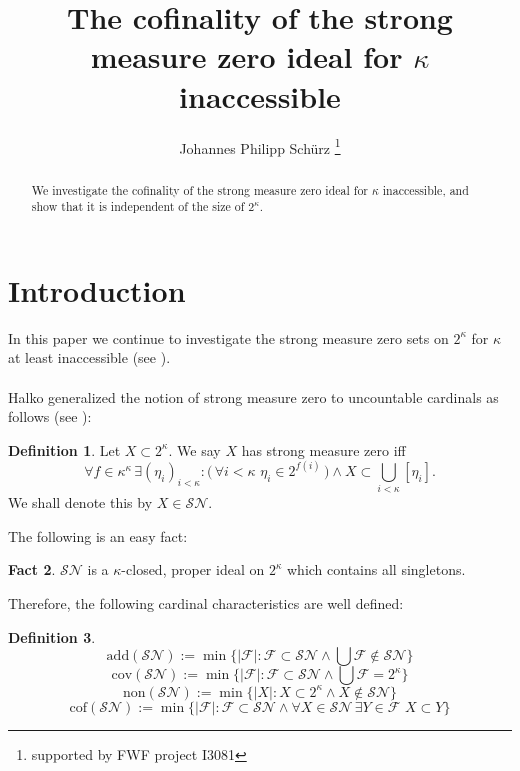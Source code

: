 \documentclass[12pt,a4paper]{scrartcl}
\title{The cofinality of the strong measure zero ideal for $\kappa$ inaccessible}
\author{Johannes Philipp Sch\"urz \footnote{supported by FWF project I3081} }
\date{}
\theoremstyle{definition}
\newtheorem{definition}{Definition}[section]
\newtheorem{fact}[definition]{Fact}
\numberwithin{equation}{section}
\begin{document}
\maketitle

\begin{abstract}
We investigate the cofinality of the strong measure zero ideal for $\kappa$ inaccessible, and show that it is independent of the size of $2^\kappa$.
\end{abstract} 

\section{Introduction}

In this paper we continue to investigate the strong measure zero sets on $2^\kappa$ for $\kappa$ at least inaccessible (see \cite{Me}).\\
\\
Halko generalized the notion of strong measure zero to uncountable cardinals as follows (see \cite{Halko}):

\begin{definition}
Let $X \subset 2^\kappa$. We say $X$ has strong measure zero iff
$$\forall f\in \kappa^\kappa \, \exists (\eta_i)_{i < \kappa} \colon \big (\, \forall i < \kappa \,\, \eta_i \in 2^{f(i)} \, \big ) \land  X \subset \bigcup_{i< \kappa} [\eta_i].$$
We shall denote this by $X \in \mathcal{SN}$.
\end{definition}

The following is an easy fact:

\begin{fact}
$\mathcal{SN}$ is a $\kappa$-closed, proper ideal on $2^\kappa$ which contains all singletons.
\end{fact}

Therefore, the following cardinal characteristics are well defined:

\begin{definition}
$$\text{add}(\mathcal{SN}):= \min \{\vert \mathcal{F} \vert \colon \mathcal{F} \subset \mathcal{SN} \land \bigcup \mathcal{F} \notin \mathcal{SN}\}$$
$$\text{cov}(\mathcal{SN}):= \min \{\vert \mathcal{F} \vert \colon \mathcal{F} \subset \mathcal{SN} \land \bigcup \mathcal{F} =2^\kappa\}$$
$$\text{non}(\mathcal{SN}):= \min \{\vert X \vert \colon X \subset 2^\kappa \land  X \notin \mathcal{SN}\}$$
$$\text{cof}(\mathcal{SN}):= \min \{\vert \mathcal{F} \vert \colon \mathcal{F} \subset \mathcal{SN} \land 
\forall X \in \mathcal{SN} \, \exists Y \in \mathcal{F} \,\, X \subset Y\}$$
\end{definition}
\end{document}
